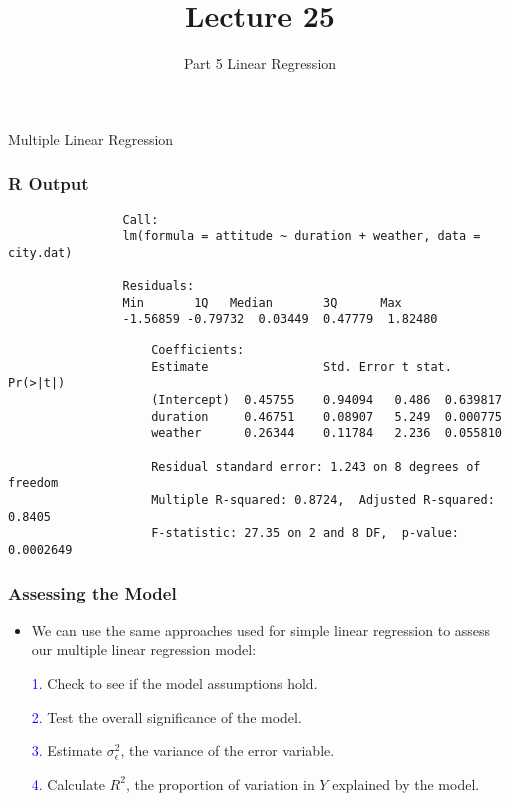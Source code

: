\documentclass[14pt]{beamer}
\title[ECON2843]{Lecture 25}
\subtitle{Part 5 Linear Regression}
\date{}
\begin{document}
	\begin{frame}
		\titlepage
		
	\end{frame}
	\begin{frame}
		\vspace{1cm}
		\centering
		{\color{blue}\large Multiple Linear Regression}
	\end{frame}
	\begin{frame}[fragile]
		\frametitle{R Output}
		{\footnotesize
			\begin{verbatim}
				Call:
				lm(formula = attitude ~ duration + weather, data = city.dat)
				
				Residuals:
				Min       1Q   Median       3Q      Max 
				-1.56859 -0.79732  0.03449  0.47779  1.82480 
			\end{verbatim}
			{\color{red}
				\begin{verbatim}
					Coefficients:
					Estimate                Std. Error t stat. Pr(>|t|)
					(Intercept)  0.45755    0.94094   0.486  0.639817
					duration     0.46751    0.08907   5.249  0.000775
					weather      0.26344    0.11784   2.236  0.055810
					
					Residual standard error: 1.243 on 8 degrees of freedom
					Multiple R-squared: 0.8724,  Adjusted R-squared: 0.8405
					F-statistic: 27.35 on 2 and 8 DF,  p-value: 0.0002649
				\end{verbatim}
		}}
		
	\end{frame}
\begin{frame}
	\frametitle{Assessing the Model}
	
	\begin{itemize}[label={\color{blue}$\blacktriangleright$}]
		\item We can use the same approaches used for simple linear regression to assess our multiple linear regression model:
	\end{itemize}
	
	\begin{enumerate}
		\item[\textcolor{blue}{1.}] Check to see if the model assumptions hold.
		\item[\textcolor{blue}{2.}] Test the overall significance of the model.
		\item[\textcolor{blue}{3.}] Estimate $\sigma_\epsilon^2$, the variance of the error variable.
		\item[\textcolor{blue}{4.}] Calculate $R^2$, the proportion of variation in $Y$ explained by the model.
	\end{enumerate}
	
\end{frame}
\end{document}
